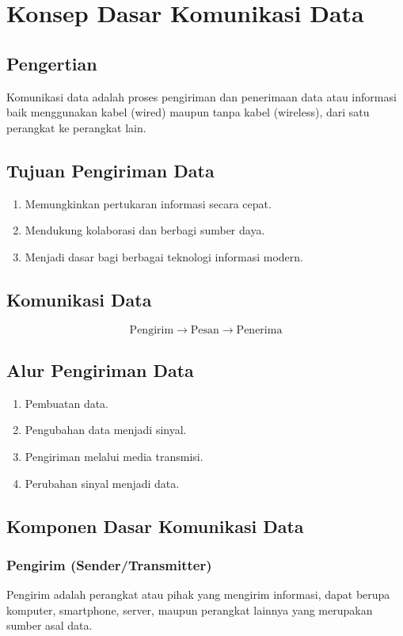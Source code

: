 \section{Konsep Dasar Komunikasi Data}

\subsection{Pengertian}
Komunikasi data adalah proses pengiriman dan penerimaan data atau informasi baik menggunakan kabel (wired) maupun tanpa kabel (wireless), dari satu perangkat ke perangkat lain.

\subsection{Tujuan Pengiriman Data}
\begin{enumerate}
\item Memungkinkan pertukaran informasi secara cepat.
\item Mendukung kolaborasi dan berbagi sumber daya.
\item Menjadi dasar bagi berbagai teknologi informasi modern.
\end{enumerate}

\subsection{Komunikasi Data}
$$\text{Pengirim} \to \text{Pesan} \to \text{Penerima}$$

\subsection{Alur Pengiriman Data}
\begin{enumerate}
\item Pembuatan data.
\item Pengubahan data menjadi sinyal.
\item Pengiriman melalui media transmisi.
\item Perubahan sinyal menjadi data.
\end{enumerate}

\subsection{Komponen Dasar Komunikasi Data}
\subsubsection{Pengirim (Sender/Transmitter)}
Pengirim adalah perangkat atau pihak yang mengirim informasi, dapat berupa komputer, smartphone, server, maupun perangkat lainnya yang merupakan sumber asal data.
